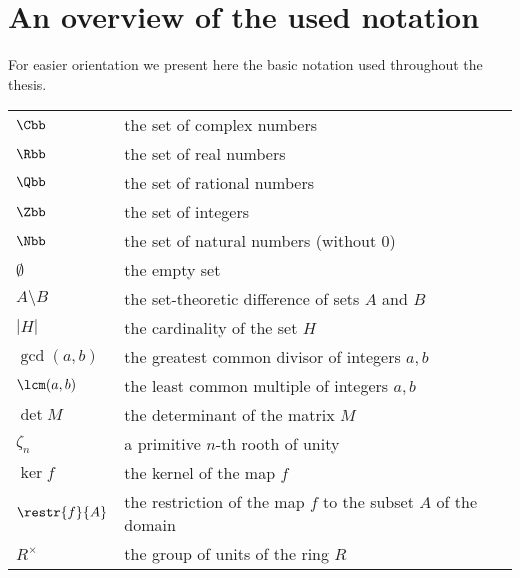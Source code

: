 \chapter*{An overview of the used notation}
For easier orientation we present here the basic notation used throughout the thesis.
\begin{longtable}[l]{ll} %
  $\Cbb$                 & the set of complex numbers \\[1mm]
  $\Rbb$                 & the set of real numbers \\[1mm]
  $\Qbb$                 & the set of rational numbers \\[1mm]
  $\Zbb$                 & the set of integers \\[1mm]
  $\Nbb$                 & the set of natural numbers (without $0$)\\[1mm]
  $\emptyset$                 & the empty set\\[1mm]
  $A\setminus B$  & the set-theoretic difference of sets $A$ and $B$\\[1mm]
  $|H|$						& the cardinality of the set $H$  \\[1mm]
  $\gcd(a,b)$			& the greatest common divisor of integers $a,b$ \\[1mm]
  $\lcm(a,b)$			& the least common multiple of integers $a,b$ \\[1mm]
  $\det M$			& the determinant of the matrix $M$ \\[1mm]
  $\zeta_n$                 & a primitive $n$-th rooth of unity \\[1mm] %
  $\ker f$                 & the kernel of the map $f$ \\[1mm]
  $\restr{f}{A}$		& the restriction of the map $f$ to the subset $A$ of the domain \\[1mm]
  $R^{\times}$		& the group of units of the ring $R$ \\[1mm]

\end{longtable}
